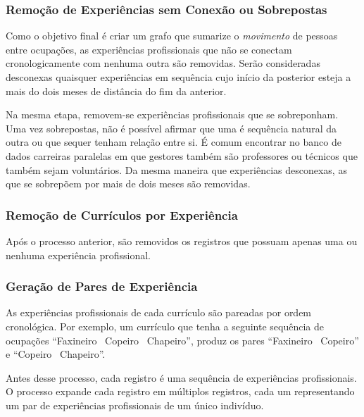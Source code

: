 \documentclass[12pt,a4paper]{article}
\theoremstyle{hypo}
\begin{document}

\subsubsection{Remoção de Experiências sem Conexão ou Sobrepostas}

Como o objetivo final é criar um grafo que sumarize o \textit{movimento} de pessoas entre ocupações, as experiências profissionais que não se conectam cronologicamente com nenhuma outra são removidas. Serão consideradas desconexas quaisquer experiências em sequência cujo início da posterior esteja a mais do dois meses de distância do fim da anterior.


Na mesma etapa, removem-se experiências profissionais que se sobreponham. Uma vez sobrepostas, não é possível afirmar que uma é sequência natural da outra ou que sequer tenham relação entre si. É comum encontrar no banco de dados carreiras paralelas em que gestores também são professores ou técnicos que também sejam voluntários. Da mesma maneira que experiências desconexas, as que se sobrepõem por mais de dois meses são removidas.

\subsubsection{Remoção de Currículos por Experiência}

Após o processo anterior, são removidos os registros que possuam apenas uma ou nenhuma experiência profissional.

\subsubsection{Geração de Pares de Experiência}

As experiências profissionais de cada currículo são pareadas por ordem cronológica. Por exemplo, um currículo que tenha a seguinte sequência de ocupações \enquote{Faxineiro \textrightarrow~Copeiro \textrightarrow~Chapeiro}, produz os pares \enquote{Faxineiro \textrightarrow~Copeiro} e \enquote{Copeiro \textrightarrow~Chapeiro}.

Antes desse processo, cada registro é uma sequência de experiências profissionais. O processo expande cada registro em múltiplos registros, cada um representando um par de experiências profissionais de um único indivíduo.
\end{document}
